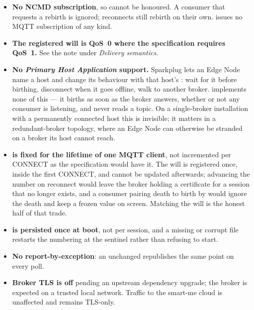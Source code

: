 \begin{itemize}
  \item \textbf{No NCMD subscription}, so  cannot be honoured.
        A consumer that requests a rebirth is ignored; reconnects still rebirth on their
        own. \prog issues no MQTT subscription of any kind.
  \item \textbf{The registered will is QoS~0 where the specification requires QoS~1.}
        See the note under \emph{Delivery semantics}.
  \item \textbf{No \emph{Primary Host Application} support.} Sparkplug lets an Edge Node
        name a host and change its behaviour with that host's : wait for it
        before birthing, disconnect when it goes offline, walk to another broker. \prog
        implements none of this --- it births as soon as the broker answers, whether or
        not any consumer is listening, and never reads a  topic. On a
        single-broker installation with a permanently connected host this is invisible;
        it matters in a redundant-broker topology, where an Edge Node can otherwise be
        stranded on a broker its host cannot reach.
  \item \textbf{ is fixed for the lifetime of one MQTT client}, not
        incremented per CONNECT as the specification would have it. The will is registered
        once, inside the first CONNECT, and cannot be updated afterwards; advancing the
        number on reconnect would leave the broker holding a certificate for a session
        that no longer exists, and a consumer pairing death to birth by 
        would ignore the death and keep a frozen value on screen. Matching the will is
        the honest half of that trade.
  \item \textbf{ is persisted once at boot}, not per session, and a missing or
        corrupt file restarts the numbering at the sentinel rather than refusing to start.
  \item \textbf{No report-by-exception}: an unchanged  republishes the
        same point on every poll.
  \item \textbf{Broker TLS is off} pending an upstream dependency upgrade; the broker is
        expected on a trusted local network. Traffic to the smart-me cloud is unaffected
        and remains TLS-only.
\end{itemize}

